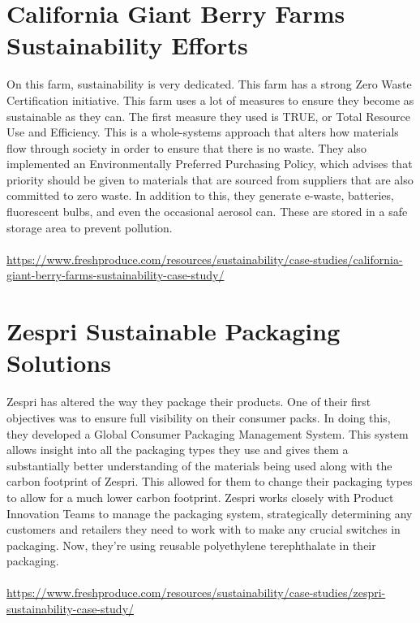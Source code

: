 \documentclass{article}
\begin{document}
\begin{spacing}{2.15}
    \section{California Giant Berry Farms Sustainability Efforts}
    \indent On this farm, sustainability is very dedicated. This farm has a strong Zero Waste Certification initiative. This farm uses a lot of measures to ensure they become as sustainable as they can. The first measure they used is TRUE, or Total Resource Use and Efficiency. This is a whole-systems approach that alters how materials flow through society in order to ensure that there is no waste. They also implemented an Environmentally Preferred Purchasing Policy, which advises that priority should be given to materials that are sourced from suppliers that are also committed to zero waste. In addition to this, they generate e-waste, batteries, fluorescent bulbs, and even the occasional aerosol can. These are stored in a safe storage area to prevent pollution.\\\\
    \url{https://www.freshproduce.com/resources/sustainability/case-studies/california-giant-berry-farms-sustainability-case-study/}
    \section{Zespri Sustainable Packaging Solutions}
    \indent Zespri has altered the way they package their products. One of their first objectives was to ensure full visibility on their consumer packs. In doing this, they developed a Global Consumer Packaging Management System. This system allows insight into all the packaging types they use and gives them a substantially better understanding of the materials being used along with the carbon footprint of Zespri. This allowed for them to change their packaging types to allow for a much lower carbon footprint. Zespri works closely with Product Innovation Teams to manage the packaging system, strategically determining any customers and retailers they need to work with to make any crucial switches in packaging. Now, they're using reusable polyethylene terephthalate in their packaging.\\\\
    \url{https://www.freshproduce.com/resources/sustainability/case-studies/zespri-sustainability-case-study/}
    \newpage

\end{spacing}
\end{document}
